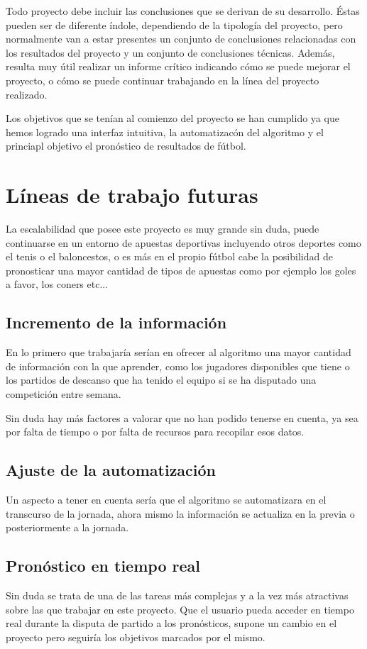 
Todo proyecto debe incluir las conclusiones que se derivan de su desarrollo. Éstas pueden ser de diferente índole, dependiendo de la tipología del proyecto, pero normalmente van a estar presentes un conjunto de conclusiones relacionadas con los resultados del proyecto y un conjunto de conclusiones técnicas. 
Además, resulta muy útil realizar un informe crítico indicando cómo se puede mejorar el proyecto, o cómo se puede continuar trabajando en la línea del proyecto realizado. 

Los objetivos que se tenían al comienzo del proyecto se han cumplido ya que hemos logrado una interfaz intuitiva, la automatizacón del algoritmo y el princiapl objetivo el pronóstico de resultados de fútbol.

\section{Líneas de trabajo futuras}
La escalabilidad que posee este proyecto es muy grande sin duda, puede continuarse en un entorno de apuestas deportivas incluyendo otros deportes como el tenis o el baloncestos, o es más en el propio fútbol cabe la posibilidad de pronosticar una mayor cantidad de tipos de apuestas como por ejemplo los goles a favor, los coners etc...

\subsection{Incremento de la información}
En lo primero que trabajaría serían en ofrecer al algoritmo una mayor cantidad de información con la que aprender, como los jugadores disponibles que tiene o los partidos de descanso que ha tenido el equipo si se ha disputado una competición entre semana. 

Sin duda hay más factores a valorar que no han podido tenerse en cuenta, ya sea por falta de tiempo o por falta de recursos para recopilar esos datos.

\subsection{Ajuste de la automatización}
Un aspecto a tener en cuenta sería que el algoritmo se automatizara en el transcurso de la jornada, ahora mismo la información se actualiza en la previa o posteriormente a la jornada. 

\subsection{Pronóstico en tiempo real}
Sin duda se trata de una de las tareas más complejas y a la vez más atractivas sobre las que trabajar en este proyecto. Que el usuario pueda acceder en tiempo real durante la disputa de partido a los pronósticos, supone un cambio en el proyecto pero seguiría los objetivos marcados por el mismo.